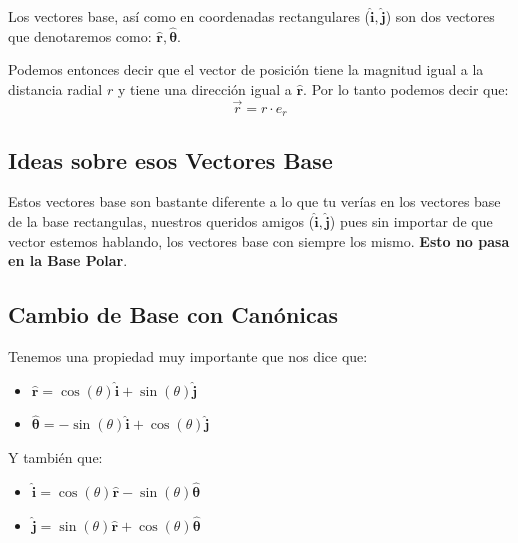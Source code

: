 \documentclass[12pt, fleqn]{report}                             %
\newcommand{\Wrap}[1]{\left( #1 \right)}                        %
\newcommand{\uVec}[1]{\boldsymbol{\hat{\textbf{$#1$}}}}         %
\newcommand{\Cos}[1]{\cos\Wrap{#1}}                             %
\newcommand{\Sin}[1]{\sin\Wrap{#1}}                             %
\begin{document}
            Los vectores base, así como en coordenadas rectangulares ($\uVec{i}, \uVec{j}$) son dos
            vectores que denotaremos como: $\uVec{r}, \uVec{\theta}$. 

            Podemos entonces decir que el vector de posición tiene la magnitud igual a la distancia
            radial $r$ y tiene una dirección igual a $\uVec{r}$.
            Por lo tanto podemos decir que:
            \begin{equation}
                \vec{r} = r \cdot e_r
            \end{equation}






            \subsection{Ideas sobre esos Vectores Base}

                Estos vectores base son bastante diferente a lo que tu verías en los vectores
                base de la base rectangulas, nuestros queridos amigos ($\uVec{i}, \uVec{j}$)
                pues sin importar de que vector estemos hablando, los vectores base con siempre 
                los mismo.
                \textbf{Esto no pasa en la Base Polar}.



            \clearpage
            \subsection{Cambio de Base con Canónicas}
                Tenemos una propiedad muy importante que nos dice que:
                \begin{itemize}
                    \item $\uVec{r}      =  \Cos{\theta}\uVec{i} + \Sin{\theta} \uVec{j}$
                    \item $\uVec{\theta} = -\Sin{\theta}\uVec{i} + \Cos{\theta} \uVec{j}$
                \end{itemize}


                Y también que:
                \begin{itemize}
                    \item $\uVec{i} = \Cos{\theta}\uVec{r} - \Sin{\theta} \uVec{\theta}$
                    \item $\uVec{j} = \Sin{\theta}\uVec{r} + \Cos{\theta} \uVec{\theta}$
                \end{itemize}
\end{document}
